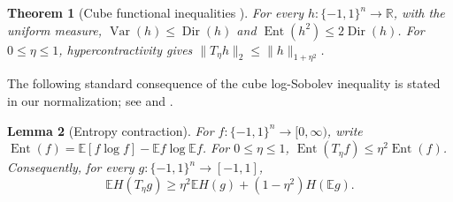 \documentclass[11pt,letterpaper]{amsart}
\newcommand{\E}{\mathbb E}
\newcommand{\R}{\mathbb R}
\newcommand{\1}{\mathbf 1}
\DeclareMathOperator{\Ent}{Ent}
\DeclareMathOperator{\Var}{Var}
\newtheorem{theorem}{Theorem}[section]
\newtheorem{lemma}[theorem]{Lemma}
\numberwithin{equation}{section}
\begin{document}
\begin{theorem}[Cube functional inequalities
{\cite{Gross1975,ODonnell2014}}]\label{ext:cube-functional}
For every $h:\{-1,1\}^n\to\R$, with the uniform measure,
$\Var(h)\le\operatorname{Dir}(h)$ and
$\Ent(h^2)\le2\operatorname{Dir}(h)$.
For $0\le\eta\le1$, hypercontractivity gives
$\|T_\eta h\|_2\le\|h\|_{1+\eta^2}$.
\end{theorem}
The following standard consequence
of the cube log-Sobolev inequality is stated in our normalization; see
\cite{Gross1975} and \cite[Exercise~10.23]{ODonnell2014}.

\begin{lemma}[Entropy contraction]\label{jp:contraction}
For $f:\{-1,1\}^n\to[0,\infty)$, write
$\Ent(f)=\E[f\log f]-\E f\log\E f$.
For $0\le\eta\le1$, $\Ent(T_\eta f)\le\eta^2\Ent(f)$.
Consequently, for every $g:\{-1,1\}^n\to[-1,1]$,
\[
 \E H(T_\eta g)\ge \eta^2\E H(g)+(1-\eta^2)H(\E g).
\]
\end{lemma}
\end{document}
